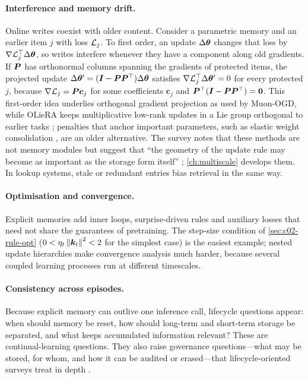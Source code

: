 \paragraph{Interference and memory drift.} Online writes coexist with older content. Consider a
parametric memory and an earlier item $j$ with loss $\mathcal{L}_j$. To first order, an update
$\Delta\bm{\theta}$ changes that loss by $\nabla\mathcal{L}_j^{\top}\Delta\bm{\theta}$, so writes interfere whenever
they have a component along old gradients. If $\bm{P}$ has orthonormal columns spanning the gradients
of protected items, the projected update $\Delta\bm{\theta}' = (\bm{I} - \bm{P}\bm{P}^{\top})\Delta\bm{\theta}$ satisfies
$\nabla\mathcal{L}_j^{\top}\Delta\bm{\theta}' = 0$ for every protected $j$, because $\nabla\mathcal{L}_j = \bm{P}\bm{c}_j$
for some coefficients $\bm{c}_j$ and $\bm{P}^{\top}(\bm{I} - \bm{P}\bm{P}^{\top}) = \mathbf{0}$. This first-order idea
underlies orthogonal gradient projection as used by Muon-OGD, while OLieRA keeps multiplicative
low-rank updates in a Lie group orthogonal to earlier tasks \citep{lu2026muonogd,cao2025olora}; penalties that anchor
important parameters, such as elastic weight consolidation \citep{c02-kirkpatrick2017ewc}, are an
older alternative. The survey notes that these methods are not memory modules but suggest that ``the
geometry of the update rule may become as important as the storage form itself''
\citep[\S IV-E]{zhoubian2026memory}; \cref{ch:multiscale} develops them. In lookup systems, stale or
redundant entries bias retrieval in the same way.

\paragraph{Optimisation and convergence.} Explicit memories add inner loops, surprise-driven rules
and auxiliary losses that need not share the guarantees of pretraining. The step-size condition of
\cref{sec:c02-rule-opt} ($0 < \eta_t\left\lVert \bm{k}_t\right\rVert^2 < 2$ for the simplest case) is the easiest
example; nested update hierarchies make convergence analysis much harder, because several coupled
learning processes run at different timescales.

\paragraph{Consistency across episodes.} Because explicit memory can outlive one inference call,
lifecycle questions appear: when should memory be reset, how should long-term and short-term
storage be separated, and what keeps accumulated information relevant? These are continual-learning
questions. They also raise governance questions---what may be stored, for whom, and how it can be
audited or erased---that lifecycle-oriented surveys treat in depth \citep{zhang2025llmmemory}.

